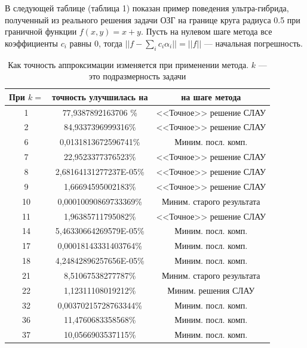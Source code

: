 \documentclass[a4paper]{article}
\begin{document}
В следующей таблице (таблица 1) показан пример поведения ультра-гибрида, полученный из реального решения задачи ОЗГ на границе круга радиуса 0.5 при граничной функции $f(x,y)=x+y$.
Пусть на нулевом шаге метода все коэффициенты $c_i$ равны 0, тогда $||f-\sum_i c_i \alpha_i||=||f||$ --- начальная погрешность.

\begin{table}[h]

  \label{tabl}
  \caption{Как точность аппроксимации изменяется при применении метода. $k$ --- это подразмерность задачи}
  \vspace{-12pt}
  \begin{center}
    \begin{tabular}[t]{|c|c|c|}
      \hline
      При $k=$ & точность улучшилась на & на шаге метода            \\
      \hline
      1        & 77,9387892163706 \%    & <<Точное>> решение СЛАУ   \\
      2        & 84,9337396999316\%     & <<Точное>> решение СЛАУ   \\
      6        & 0,0131813672596741\%   & Миним. посл. комп.   \\
      7        & 22,9523377376523\%     & <<Точное>> решение СЛАУ   \\
      8        & 2,68164131277237E-05\% & <<Точное>> решение СЛАУ   \\
      9        & 1,66694595002183\%     & <<Точное>> решение СЛАУ   \\
      10       & 0,00010090869733369\%  & Миним. старого результата \\
      11       & 1,96385711795082\%     & <<Точное>> решение СЛАУ   \\
      14       & 5,46330664269579E-05\% & Миним. посл. комп.   \\
      17       & 0,00018143331403764\%  & Миним. посл. комп.   \\
      18       & 4,24842896257656E-05\% & Миним. посл. комп.   \\
      21       & 8,51067538277787\%     & Миним. старого результата \\
      22       & 1,12311108019212\%     & Миним. решения СЛАУ       \\
      32       & 0,00370215728763344\%  & Миним. посл. комп.   \\
      36       & 11,4760683358568\%     & Миним. посл. комп.   \\
      37       & 10,0566903537115\%     & Миним. посл. комп.   \\

\end{tabular}
\end{center}
\end{table}
\end{document}
